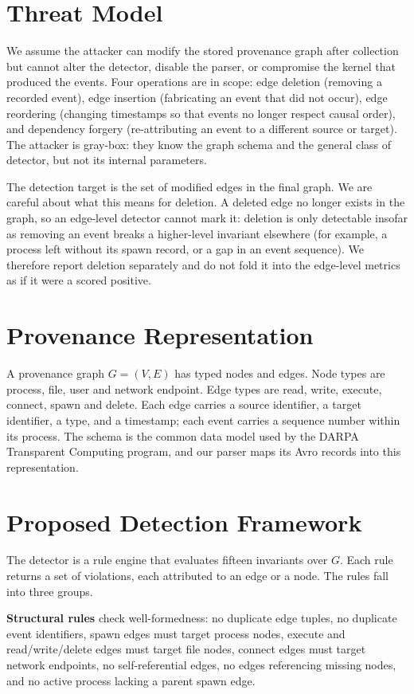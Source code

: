 \documentclass[conference]{IEEEtran}
\begin{document}
\section{Threat Model}
We assume the attacker can modify the stored provenance graph after collection
but cannot alter the detector, disable the parser, or compromise the kernel that
produced the events. Four operations are in scope: edge deletion (removing a
recorded event), edge insertion (fabricating an event that did not occur),
edge reordering (changing timestamps so that events no longer respect causal
order), and dependency forgery (re-attributing an event to a different source or
target). The attacker is gray-box: they know the graph schema and the general
class of detector, but not its internal parameters.

The detection target is the set of modified edges in the final graph. We are
careful about what this means for deletion. A deleted edge no longer exists in
the graph, so an edge-level detector cannot mark it: deletion is only detectable
insofar as removing an event breaks a higher-level invariant elsewhere (for
example, a process left without its spawn record, or a gap in an event
sequence). We therefore report deletion separately and do not fold it into the
edge-level metrics as if it were a scored positive.

\section{Provenance Representation}
A provenance graph $G=(V,E)$ has typed nodes and edges. Node types are process,
file, user and network endpoint. Edge types are read, write, execute, connect,
spawn and delete. Each edge carries a source identifier, a target identifier, a
type, and a timestamp; each event carries a sequence number within its process.
The schema is the common data model used by the DARPA Transparent Computing
program, and our parser maps its Avro records into this representation.

\section{Proposed Detection Framework}
\label{sec:method}
The detector is a rule engine that evaluates fifteen invariants over $G$. Each
rule returns a set of violations, each attributed to an edge or a node. The
rules fall into three groups.

\textbf{Structural rules} check well-formedness: no duplicate edge tuples, no
duplicate event identifiers, spawn edges must target process nodes, execute and
read/write/delete edges must target file nodes, connect edges must target
network endpoints, no self-referential edges, no edges referencing missing
nodes, and no active process lacking a parent spawn edge.
\end{document}
